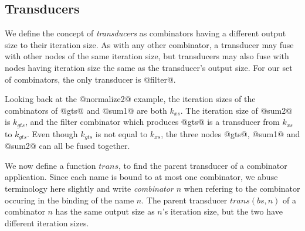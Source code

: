 


\subsection{Transducers}

We define the concept of \emph{transducers} as combinators having a different output size to their iteration size.
As with any other combinator, a transducer may fuse with other nodes of the same iteration size, but transducers may also fuse with nodes having iteration size the same as the transducer's output size.
For our set of combinators, the only transducer is @filter@.

Looking back at the @normalize2@ example, the iteration sizes of the combinators of @gts@ and @sum1@ are both $k_{xs}$.
The iteration size of @sum2@ is $k_{gts}$, and the filter combinator which produces @gts@ is a transducer from $k_{xs}$ to $k_{gts}$. 
Even though $k_{gts}$ is not equal to $k_{xs}$, the three nodes @gts@, @sum1@ and @sum2@ can all be fused together.

We now define a function $trans$, to find the parent transducer of a combinator application. Since each name is bound to at most one combinator, we abuse terminology here slightly and write \emph{combinator $n$} when refering to the combinator occuring in the binding of the name $n$.
The parent transducer $trans(bs, n)$ of a combinator $n$ has the same output size as $n$'s iteration size, but the two have different iteration sizes.


